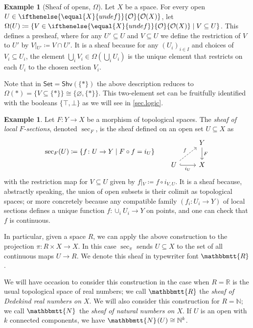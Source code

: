 \documentclass[reqno,11pt]{amsproc}
\theoremstyle{plain}
\theoremstyle{definition}
\newtheorem{example}[theorem]{Example}
\newcommand{\cat}[1]{\mathsf{#1}}
\newcommand{\Set}{\cat{Set}}
\renewcommand{\to}[1][]{\xrightarrow{#1}}
\newcommand{\internal}[1]{\raisebox{-.03ex}{$\mathbbmtt{#1}$}}
\newcommand{\nn}{\mathbb{N}}
\newcommand{\rr}{\mathbb{R}}
\newcommand{\hs}{\hspace{1pt}}
\newcommand{\tnn}{\internal{N}\hs}
\newcommand{\trr}{\internal{R}}
\newcommand{\shv}{\cat{Shv}}
\newcommand{\Op}[1][undef]{\ifthenelse{\equal{#1}{undef}}{\mathcal{O}}{\mathcal{O}(#1)}}
\newcommand{\rest}[2]{#1\big|\hspace{0in}_{#2}}
\numberwithin{equation}{section}
\begin{document}
\begin{example}[Sheaf of opens, $\Omega$]\label{ex.subobject_classifier}
Let $X$ be a space. For every open $U\in\Op[X]$, let $\Omega(U)\coloneqq\{V\in\Op[X]\mid V\subseteq U\}$. This defines a presheaf, where for any $U'\subseteq U$ and $V\subseteq U$ we define the restriction of $V$ to $U'$ by $\rest{V}{U'}\coloneqq V\cap U'$. It is a sheaf because for any $(U_i)_{i\in I}$ and choices of $V_i\subseteq U_i$, the element $\bigcup_iV_i\in\Omega(\bigcup_i U_i)$ is the unique element that restricts on each $U_i$ to the chosen section $V_i$.

Note that in $\Set=\shv(\{*\})$ the above description reduces to $\Omega(*)=\{V\subseteq\{*\}\}\cong\{\varnothing,\{*\}\}$. This two-element set can be fruitfully identified with the booleans $\{\top,\bot\}$ as we will see in \cref{sec.logic}.
\end{example}

\begin{example}\label{ex.sections}
Let $F\colon Y\to X$ be a morphism of topological spaces. The \emph{sheaf of local $F$-sections}, denoted $\sec_F$, is the sheaf defined on an open set $U\subseteq X$ as
\begin{equation}\label{eqn.sections}
\sec_F(U)\coloneqq\{f\colon U\to Y\mid F\circ f=i_U\}
\qquad
\begin{tikzcd}
	&Y\ar[d, "F"]\\
	U\ar[r, hook, "i_U"']\ar[ur, dashed, "f"]&
	X
\end{tikzcd}
\end{equation}
with the restriction map for $V\subseteq U$ given by $\rest{f}{V}\coloneqq f\circ i_{V,U}$. It is a sheaf because, abstractly speaking, the union of open subsets is their colimit as topological spaces; or more concretely because any compatible family $(f_i\colon U_i\to Y)$ of local sections defines a unique function $f\colon \cup_iU_i\to Y$ on points, and one can check that $f$ is continuous.

In particular, given a space $R$, we can apply the above construction to the projection $\pi\colon R\times X\to X$. In this case $\sec_\pi$ sends $U\subseteq X$ to the set of all continuous maps $U\to R$. We denote this sheaf in typewriter font $\internal{R}$.

We will have occasion to consider this construction in the case when $R=\rr$ is the usual topological space of real numbers; we call $\trr$ the \emph{sheaf of Dedekind real numbers on $X$}. We will also consider this construction for $R=\nn$; we call $\tnn$ the \emph{sheaf of natural numbers on $X$}. If $U$ is an open with $k$ connected components, we have $\tnn(U)\cong\nn^k$.
\end{example}
\end{document}
